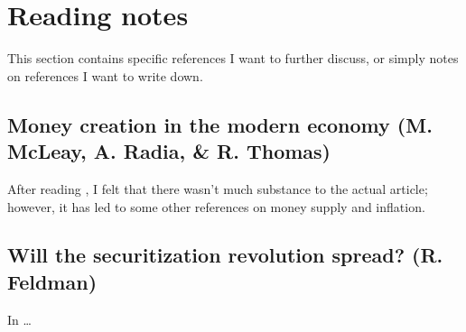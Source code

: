\section{Reading notes}

This section contains specific references I want to further discuss, or simply notes on references I want to write down.


\subsection{Money creation in the modern economy (M. McLeay, A. Radia, \& R. Thomas)}

After reading \cite{BOE2014}, I felt that there wasn't much substance to the actual article; however, it has led to some other references on money supply and inflation.


\subsection{Will the securitization revolution spread? (R. Feldman)}

In \cite{Feldman1995} \ldots

